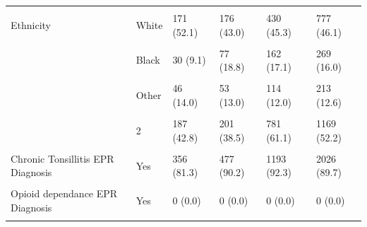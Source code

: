 \documentclass[
  letterpaper,
  DIV=11,
  numbers=noendperiod]{scrreprt}
\begin{document}
\begin{stbl}
{\begin{table}
\begin{tabular*}{\linewidth}{@{\extracolsep{\fill}}llllll}
{\cellcolor[HTML]{F2F2F2}{}} & {\cellcolor[HTML]{F2F2F2}{Male}} & {\cellcolor[HTML]{F2F2F2}{}} & {\cellcolor[HTML]{F2F2F2}{}} & {\cellcolor[HTML]{F2F2F2}{2 (100.0)}} & {\cellcolor[HTML]{F2F2F2}{2 (50.0)}} \\ 
{Ethnicity} & {White} & {171 (52.1)} & {176 (43.0)} & {430 (45.3)} & {777 (46.1)} \\ 
{\cellcolor[HTML]{F2F2F2}{}} & {\cellcolor[HTML]{F2F2F2}{Asian}} & {\cellcolor[HTML]{F2F2F2}{60 (18.3)}} & {\cellcolor[HTML]{F2F2F2}{71 (17.4)}} & {\cellcolor[HTML]{F2F2F2}{147 (15.5)}} & {\cellcolor[HTML]{F2F2F2}{278 (16.5)}} \\ 
 & Black & {30 (9.1)} & 77 (18.8) & 162 (17.1) & 269 (16.0) \\ 
{\cellcolor[HTML]{F2F2F2}{}} & {\cellcolor[HTML]{F2F2F2}{Mixed}} & {\cellcolor[HTML]{F2F2F2}{21 (6.4)}} & {\cellcolor[HTML]{F2F2F2}{32 (7.8)}} & {\cellcolor[HTML]{F2F2F2}{96 (10.1)}} & {\cellcolor[HTML]{F2F2F2}{149 (8.8)}} \\ 
 & Other & {46 (14.0)} & 53 (13.0) & 114 (12.0) & 213 (12.6) \\ 
{\cellcolor[HTML]{F2F2F2}{ASA physical status}} & {\cellcolor[HTML]{F2F2F2}{1}} & {\cellcolor[HTML]{F2F2F2}{246 (56.3)}} & {\cellcolor[HTML]{F2F2F2}{315 (60.3)}} & {\cellcolor[HTML]{F2F2F2}{494 (38.6)}} & {\cellcolor[HTML]{F2F2F2}{1055 (47.1)}} \\ 
 & 2 & {187 (42.8)} & 201 (38.5) & 781 (61.1) & 1169 (52.2) \\ 
{\cellcolor[HTML]{F2F2F2}{}} & {\cellcolor[HTML]{F2F2F2}{3}} & {\cellcolor[HTML]{F2F2F2}{4 (0.9)}} & {\cellcolor[HTML]{F2F2F2}{6 (1.1)}} & {\cellcolor[HTML]{F2F2F2}{4 (0.3)}} & {\cellcolor[HTML]{F2F2F2}{14 (0.6)}} \\ 
{Chronic Tonsillitis EPR Diagnosis} & {Yes} & {356 (81.3)} & {477 (90.2)} & {1193 (92.3)} & {2026 (89.7)} \\ 
{\cellcolor[HTML]{F2F2F2}{Obstructive Sleep Apnoea EPR Diagnosis}} & {\cellcolor[HTML]{F2F2F2}{Yes}} & {\cellcolor[HTML]{F2F2F2}{111 (25.3)}} & {\cellcolor[HTML]{F2F2F2}{153 (28.9)}} & {\cellcolor[HTML]{F2F2F2}{977 (75.6)}} & {\cellcolor[HTML]{F2F2F2}{1241 (54.9)}} \\ 
{Opioid dependance EPR Diagnosis} & {Yes} & {0 (0.0)} & {0 (0.0)} & {0 (0.0)} & {0 (0.0)} \\ 
{\cellcolor[HTML]{F2F2F2}{Chronic Pain EPR Diagnosis}} & {\cellcolor[HTML]{F2F2F2}{Yes}} & {\cellcolor[HTML]{F2F2F2}{0 (0.0)}} & {\cellcolor[HTML]{F2F2F2}{0 (0.0)}} & {\cellcolor[HTML]{F2F2F2}{0 (0.0)}} & {\cellcolor[HTML]{F2F2F2}{0 (0.0)}} \\ 

\end{tabular*}
\end{table}}
\end{stbl}
\end{document}
